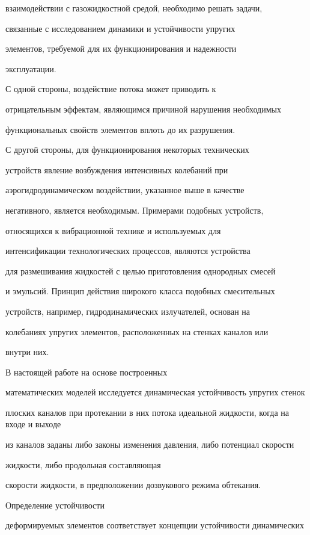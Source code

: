 взаимодействии с газожидкостной средой, необходимо решать задачи,

связанные с исследованием динамики и устойчивости упругих

элементов, требуемой для их функционирования и надежности

эксплуатации.



С одной стороны, воздействие потока может приводить к

отрицательным эффектам, являющимся причиной нарушения необходимых

функциональных свойств элементов вплоть до их разрушения.



С другой стороны, для функционирования некоторых технических

уст\-ройств явление  возбуждения интенсивных колебаний при

аэрогидродинамическом воздействии, указанное выше в качестве

негативного, является необходимым. Примерами подобных устройств,

относящихся к вибрационной технике и используемых для

интенсификации технологических процессов, являются уст\-ройства

для размешивания жидкостей с целью приготовления однородных смесей

и эмульсий. Принцип действия широкого класса подобных смесительных

устройств, например,  гидродинамических излучателей, основан на

колебаниях упругих элементов, расположенных на стенках каналов или

внутри них.



В настоящей работе на основе построенных

математических моделей исследуется динамическая устойчивость упругих стенок

плоских каналов при протекании в них потока идеальной жидкости, когда на входе и выходе

из каналов заданы либо законы изменения давления, либо потенциал скорости

жидкости, либо продольная составляющая

скорости жидкости, в предположении дозвукового режима обтекания.

Определение устойчивости

деформируемых элементов соответствует концепции устойчивости динамических

